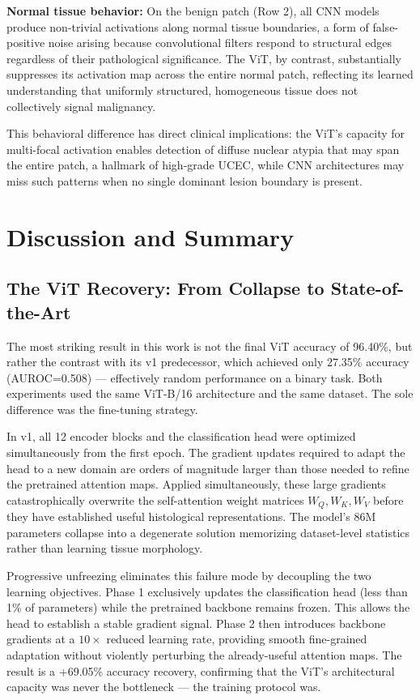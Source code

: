 \documentclass[conference]{IEEEtran}
\begin{document}
\textbf{Normal tissue behavior:} On the benign patch (Row 2), all CNN models produce non-trivial activations along normal tissue boundaries, a form of false-positive noise arising because convolutional filters respond to structural edges regardless of their pathological significance. The ViT, by contrast, substantially suppresses its activation map across the entire normal patch, reflecting its learned understanding that uniformly structured, homogeneous tissue does not collectively signal malignancy.

This behavioral difference has direct clinical implications: the ViT's capacity for multi-focal activation enables detection of diffuse nuclear atypia that may span the entire patch, a hallmark of high-grade UCEC, while CNN architectures may miss such patterns when no single dominant lesion boundary is present.

\section{Discussion and Summary}

\subsection{The ViT Recovery: From Collapse to State-of-the-Art}
The most striking result in this work is not the final ViT accuracy of 96.40\%, but rather the contrast with its v1 predecessor, which achieved only 27.35\% accuracy (AUROC=0.508) — effectively random performance on a binary task. Both experiments used the same ViT-B/16 architecture and the same dataset. The sole difference was the fine-tuning strategy.

In v1, all 12 encoder blocks and the classification head were optimized simultaneously from the first epoch. The gradient updates required to adapt the head to a new domain are orders of magnitude larger than those needed to refine the pretrained attention maps. Applied simultaneously, these large gradients catastrophically overwrite the self-attention weight matrices $W_Q, W_K, W_V$ before they have established useful histological representations. The model's 86M parameters collapse into a degenerate solution memorizing dataset-level statistics rather than learning tissue morphology.

Progressive unfreezing eliminates this failure mode by decoupling the two learning objectives. Phase 1 exclusively updates the classification head (less than 1\% of parameters) while the pretrained backbone remains frozen. This allows the head to establish a stable gradient signal. Phase 2 then introduces backbone gradients at a $10\times$ reduced learning rate, providing smooth fine-grained adaptation without violently perturbing the already-useful attention maps. The result is a +69.05\% accuracy recovery, confirming that the ViT's architectural capacity was never the bottleneck — the training protocol was.
\end{document}
